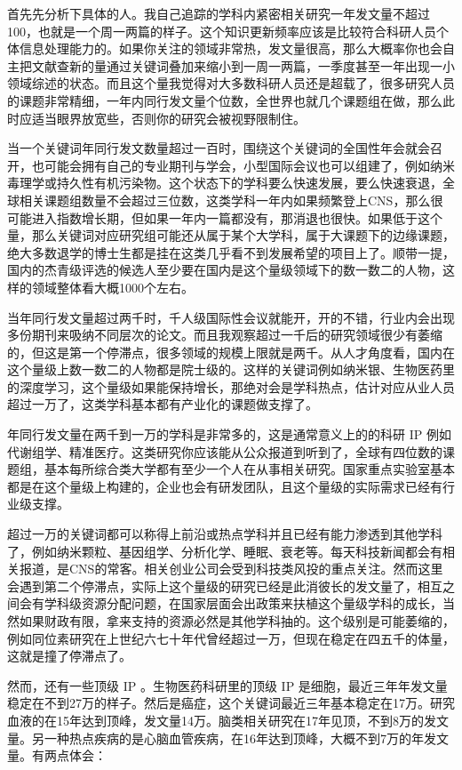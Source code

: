 \documentclass[]{tufte-book}
\begin{document}
首先先分析下具体的人。我自己追踪的学科内紧密相关研究一年发文量不超过100，也就是一个周一两篇的样子。这个知识更新频率应该是比较符合科研人员个体信息处理能力的。如果你关注的领域非常热，发文量很高，那么大概率你也会自主把文献查新的量通过关键词叠加来缩小到一周一两篇，一季度甚至一年出现一小领域综述的状态。而且这个量我觉得对大多数科研人员还是超载了，很多研究人员的课题非常精细，一年内同行发文量个位数，全世界也就几个课题组在做，那么此时应适当眼界放宽些，否则你的研究会被视野限制住。

当一个关键词年同行发文数量超过一百时，围绕这个关键词的全国性年会就会召开，也可能会拥有自己的专业期刊与学会，小型国际会议也可以组建了，例如纳米毒理学或持久性有机污染物。这个状态下的学科要么快速发展，要么快速衰退，全球相关课题组数量不会超过三位数，这类学科一年内如果频繁登上CNS，那么很可能进入指数增长期，但如果一年内一篇都没有，那消退也很快。如果低于这个量，那么关键词对应研究组可能还从属于某个大学科，属于大课题下的边缘课题，绝大多数退学的博士生都是挂在这类几乎看不到发展希望的项目上了。顺带一提，国内的杰青级评选的候选人至少要在国内是这个量级领域下的数一数二的人物，这样的领域整体看大概1000个左右。

当年同行发文量超过两千时，千人级国际性会议就能开，开的不错，行业内会出现多份期刊来吸纳不同层次的论文。而且我观察超过一千后的研究领域很少有萎缩的，但这是第一个停滞点，很多领域的规模上限就是两千。从人才角度看，国内在这个量级上数一数二的人物都是院士级的。这样的关键词例如纳米银、生物医药里的深度学习，这个量级如果能保持增长，那绝对会是学科热点，估计对应从业人员超过一万了，这类学科基本都有产业化的课题做支撑了。

年同行发文量在两千到一万的学科是非常多的，这是通常意义上的的科研 IP 例如代谢组学、精准医疗。这类研究你应该能从公众报道到听到了，全球有四位数的课题组，基本每所综合类大学都有至少一个人在从事相关研究。国家重点实验室基本都是在这个量级上构建的，企业也会有研发团队，且这个量级的实际需求已经有行业级支撑。

超过一万的关键词都可以称得上前沿或热点学科并且已经有能力渗透到其他学科了，例如纳米颗粒、基因组学、分析化学、睡眠、衰老等。每天科技新闻都会有相关报道，是CNS的常客。相关创业公司会受到科技类风投的重点关注。然而这里会遇到第二个停滞点，实际上这个量级的研究已经是此消彼长的发文量了，相互之间会有学科级资源分配问题，在国家层面会出政策来扶植这个量级学科的成长，当然如果财政有限，拿来支持的资源必然是其他学科抽的。这个级别是可能萎缩的，例如同位素研究在上世纪六七十年代曾经超过一万，但现在稳定在四五千的体量，这就是撞了停滞点了。

然而，还有一些顶级 IP 。生物医药科研里的顶级 IP 是细胞，最近三年年发文量稳定在不到27万的样子。然后是癌症，这个关键词最近三年基本稳定在17万。研究血液的在15年达到顶峰，发文量14万。脑类相关研究在17年见顶，不到8万的发文量。另一种热点疾病的是心脑血管疾病，在16年达到顶峰，大概不到7万的年发文量。有两点体会：
\end{document}
